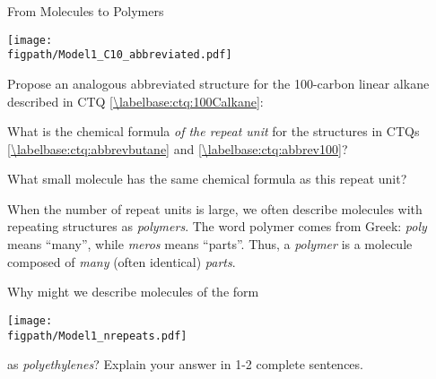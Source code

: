 \begin{activity}{From Molecules to Polymers}
\begin{ctqs}
		\vspace{6pt}
		\centerline{\texttt{[image: \\figpath/Model1\_C10\_abbreviated.pdf]}}
		
		\begin{solution}[1.25in]
		\end{solution}
	
	\question Propose an analogous abbreviated structure for the 100-carbon linear alkane described in CTQ \ref{\labelbase:ctq:100Calkane}: \label{\labelbase:ctq:abbrev100}
		
		\begin{solution}[0.75in]
		\end{solution}
	
	\question What is the chemical formula \emph{of the repeat unit} for the structures in CTQs \ref{\labelbase:ctq:abbrevbutane} and \ref{\labelbase:ctq:abbrev100}?
		
		\begin{solution}[0.75in]
		\end{solution}
	
	\question What small molecule has the same chemical formula as this repeat unit?
		
		\begin{solution}[0.75in]
		\end{solution}
	
\end{ctqs}

\begin{infobox}
	When the number of repeat units is large, we often describe molecules with repeating structures as \emph{polymers}.  The word polymer comes from Greek: \emph{poly} means ``many'', while \emph{meros} means ``parts''.  Thus, a \emph{polymer} is a molecule composed of \emph{many} (often identical) \emph{parts}.
\end{infobox}

\begin{ctqs}
	\question Why might we describe molecules of the form
	
		\centerline{\texttt{[image: \\figpath/Model1\_nrepeats.pdf]}}
			
		as \emph{polyethylenes}?  Explain your answer in 1-2 complete sentences.
		
		\begin{solution}[2in]
		\end{solution}
\end{ctqs}

\clearpage
\begin{model}
	\label{\labelbase:mdl:hydrocarbonmelting}


\end{model}
\end{activity}

